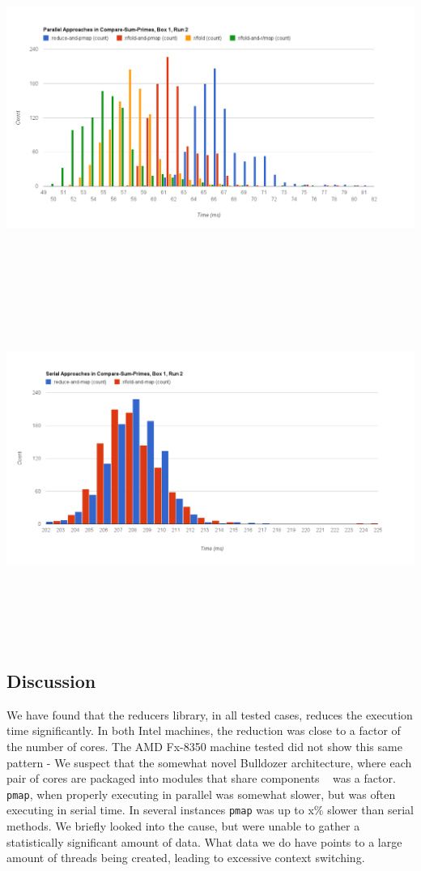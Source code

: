 \documentclass[12pt]{article}
\newcommand{\clocode}[1]{{\texttt {#1}}}
\begin{document}
\includegraphics[trim = 10mm 0mm 30mm 0mm, clip, width = 16cm,height = 10cm]{PSP-B1}
\includegraphics[trim = 10mm 0mm 10mm 5mm, clip, width = 16cm,height = 12cm]{SSP-B1}



\subsection{Discussion}\label{sec:discussion}
We have found that the reducers library, in all tested cases, reduces the execution time significantly. In both Intel machines, the reduction was close to a factor of the number of cores. The AMD Fx-8350 machine tested did not show this same pattern - We suspect that the somewhat novel Bulldozer architecture, where each pair of cores are packaged into modules that share components ~\cite{McIntyre:2012} was a factor. \clocode{pmap}, when properly executing in parallel was somewhat slower, but was often executing in serial time. In several instances \clocode{pmap} was up to x\% slower than serial methods. We briefly looked into the cause, but were unable to gather a statistically significant amount of data. What data we do have points to a large amount of threads being created, leading to excessive context switching. 
\end{document}
